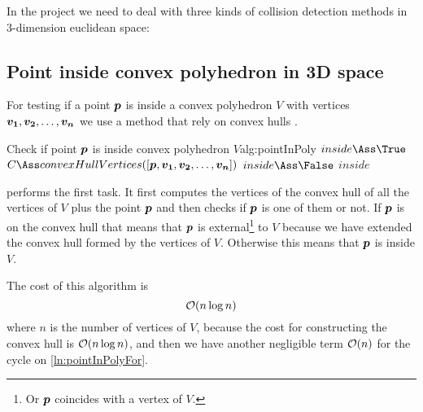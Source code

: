 \documentclass[dissertation.tex]{subfiles}
\begin{document}
In the project we need to deal with three kinds of collision detection
methods in 3-dimension euclidean space:

\subsection{Point inside convex polyhedron in 3D space}
For testing if a point $\boldsymbol{p}$ is inside a convex polyhedron $V$ with
vertices $\boldsymbol{v_1},\boldsymbol{v_2},\dots,\boldsymbol{v_n}$ we use a method that rely
on convex hulls \cite{deberg}\cite{schneider}.

\begin{algo}{Check if point $\boldsymbol{p}$ is inside convex polyhedron $V$}{alg:pointInPoly}
  \State $inside\Ass\True$
  \State $C\Ass convexHullVertices([\ve{p},\ve{v_1},\ve{v_2},\dots,\ve{v_n}])$
  \label{ln:pointInPolyFor}
  \State $inside\Ass\False$
  \State \Break
  \EndIf
  \EndFor
  \State\Return $inside$
  \EndFunction
\end{algo}
 performs the first task. It first
computes the vertices of the convex hull of all
the vertices of $V$ plus the point $\boldsymbol{p}$ and then checks if
$\boldsymbol{p}$ is one 
of them or not. If $\boldsymbol{p}$ is on the convex hull that
means that $\boldsymbol{p}$ is external\footnote{Or $\boldsymbol{p}$ coincides with a
  vertex of $V$.} to $V$ because we have extended the convex hull
formed by the vertices of $V$. Otherwise this means that $\boldsymbol{p}$ is
inside $V$.

The cost of this algorithm is
\begin{equation*}
  \mathcal{O}(n\log n)
\end{equation*}
where $n$ is the number of vertices of $V$, because the cost for
constructing the convex hull is \cite{deberg} $\mathcal{O}(n\log n)$, and
then we have another negligible term $\mathcal{O}(n)$ for the cycle on \cref{ln:pointInPolyFor}.
\end{document}
